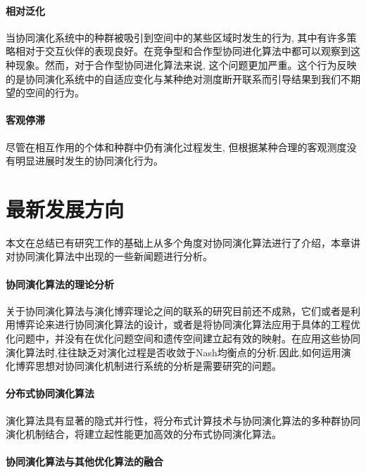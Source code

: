 \documentclass[a4paper]{article}
\begin{document}
    \paragraph{相对泛化}

    当协同演化系统中的种群被吸引到空间中的某些区域时发生的行为, 其中有许多策略相对于交互伙伴的表现良好。在竞争型和合作型协同进化算法中都可以观察到这种现象。然而，对于合作型协同进化算法来说, 这个问题更加严重。这个行为反映的是协同演化系统中的自适应变化与某种绝对测度断开联系而引导结果到我们不期望的空间的行为。

    \paragraph{客观停滞}

    尽管在相互作用的个体和种群中仍有演化过程发生, 但根据某种合理的客观测度没有明显进展时发生的协同演化行为。




    \newpage
    \section{最新发展方向}
    
    本文在总结已有研究工作的基础上从多个角度对协同演化算法进行了介绍，本章讲对协同演化算法中出现的一些新闻题进行分析。

    \paragraph{协同演化算法的理论分析}

    关于协同演化算法与演化博弈理论之间的联系的研究目前还不成熟，它们或者是利用博弈论来进行协同演化算法的设计，或者是将协同演化算法应用于具体的工程优化问题中，并没有在优化问题空间和遗传空间建立起有效的映射。在应用这些协同演化算法时,往往缺乏对演化过程是否收敛于Nash均衡点的分析.因此,如何运用演化博弈思想对协同演化机制进行系统的分析是需要研究的问题。

    \paragraph{分布式协同演化算法}

    演化算法具有显著的隐式并行性，将分布式计算技术与协同演化算法的多种群协同演化机制结合，将建立起性能更加高效的分布式协同演化算法。

    \paragraph{协同演化算法与其他优化算法的融合}
\end{document}
